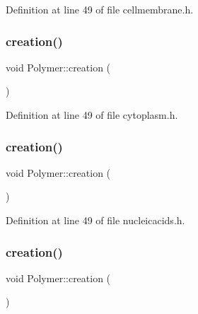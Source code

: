Definition at line 49 of file cellmembrane.\+h.

\mbox{\label{class_polymer_a1daba3eb2ba8428bf2f3e814668b155f}} 
\subsubsection{\texorpdfstring{creation()}{creation()}\hspace{0.1cm}{\footnotesize\ttfamily [7/10]}}
{\footnotesize\ttfamily void Polymer\+::creation (\begin{DoxyParamCaption}{ }\end{DoxyParamCaption})\hspace{0.3cm}{\ttfamily [inline]}}



Definition at line 49 of file cytoplasm.\+h.

\mbox{\label{class_polymer_a1daba3eb2ba8428bf2f3e814668b155f}} 
\subsubsection{\texorpdfstring{creation()}{creation()}\hspace{0.1cm}{\footnotesize\ttfamily [8/10]}}
{\footnotesize\ttfamily void Polymer\+::creation (\begin{DoxyParamCaption}{ }\end{DoxyParamCaption})\hspace{0.3cm}{\ttfamily [inline]}}



Definition at line 49 of file nucleicacids.\+h.

\mbox{\label{class_polymer_a1daba3eb2ba8428bf2f3e814668b155f}} 
\subsubsection{\texorpdfstring{creation()}{creation()}\hspace{0.1cm}{\footnotesize\ttfamily [9/10]}}
{\footnotesize\ttfamily void Polymer\+::creation (\begin{DoxyParamCaption}{ }\end{DoxyParamCaption})\hspace{0.3cm}{\ttfamily [inline]}}



